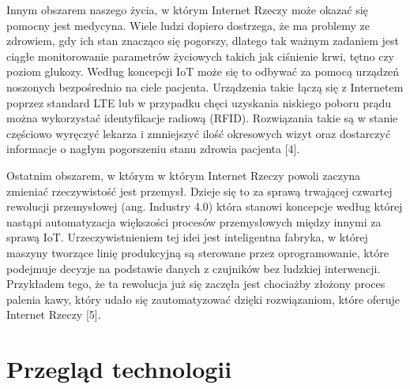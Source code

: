 \documentclass[12pt, twoside, openany]{mwrep}
\begin{document}
\par
Innym obszarem naszego życia, w którym Internet Rzeczy może okazać się pomocny jest medycyna. Wiele ludzi dopiero dostrzega, że ma problemy ze zdrowiem, gdy ich stan znacząco się pogorszy, dlatego tak ważnym zadaniem jest ciągłe monitorowanie parametrów życiowych takich jak ciśnienie krwi, tętno czy poziom glukozy. Według koncepcji IoT może się to odbywać za pomocą urządzeń noszonych bezpośrednio na ciele pacjenta. Urządzenia takie łączą się z Internetem poprzez standard LTE lub w przypadku chęci uzyskania niskiego poboru prądu można wykorzystać identyfikacje radiową (RFID). Rozwiązania takie są w stanie częściowo wyręczyć lekarza i zmniejszyć ilość okresowych wizyt oraz dostarczyć informacje o nagłym pogorszeniu stanu zdrowia pacjenta [4].
\par
Ostatnim obszarem, w którym w którym Internet Rzeczy powoli zaczyna zmieniać rzeczywistość jest przemysł. Dzieje się to za sprawą trwającej czwartej rewolucji przemysłowej (ang. Industry 4.0) która stanowi koncepcje według której nastąpi automatyzacja większości procesów przemysłowych między innymi za sprawą IoT. Urzeczywistnieniem tej idei jest inteligentna fabryka, w której maszyny tworzące linię produkcyjną są sterowane przez oprogramowanie, które podejmuje decyzje na podstawie danych z czujników bez ludzkiej interwencji. Przykładem tego, że ta rewolucja już się zaczęła jest chociażby złożony proces palenia kawy, który udało się zautomatyzować dzięki rozwiązaniom, które oferuje Internet Rzeczy [5].

\section{Przegląd technologii}
\end{document}
